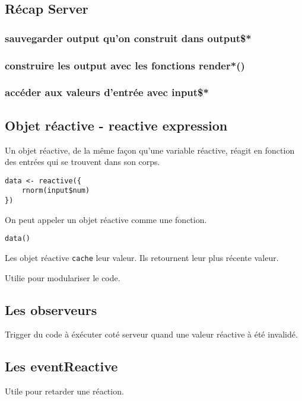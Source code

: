\documentclass[a4paper]{article}
\begin{document}
\subsection{Récap Server}
\label{sec:orgfb1a54a}
\subsubsection{sauvegarder output qu'on construit dans output\$*}
\label{sec:orgb3a323f}
\subsubsection{construire les output avec les fonctions render*()}
\label{sec:orga1e9c2c}
\subsubsection{accéder aux valeurs d'entrée avec input\$*}
\label{sec:org8cdf07e}

\subsection{Objet réactive - reactive expression}
\label{sec:org0c795e9}
Un objet réactive, de la même façon qu'une variable réactive, réagit en fonction des entrées qui se trouvent dans son corps.

\begin{verbatim}
data <- reactive({
    rnorm(input$num)
})
\end{verbatim}

On peut appeler un objet réactive comme une fonction. 
\begin{verbatim}
data()
\end{verbatim}

Les objet réactive \texttt{cache} leur valeur. Ils retournent leur plus récente valeur.

Utilie pour modulariser le code.

\subsection{Les observeurs}
\label{sec:org1613ff7}
Trigger du code à éxécuter coté serveur quand une valeur réactive à été invalidé.

\subsection{Les eventReactive}
\label{sec:org028232c}
Utile pour retarder une réaction. 
\end{document}
